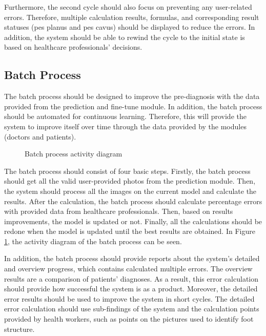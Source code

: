 Furthermore, the second cycle should also focus on preventing any user-related errors. Therefore, multiple calculation results, formulas, and corresponding result statuses (pes planus and pes cavus) should be displayed to reduce the errors. In addition, the system should be able to rewind the cycle to the initial state is based on healthcare professionals' decisions.

\subsection{ Batch Process }

The batch process should be designed to improve the pre-diagnosis with the data provided from the prediction and fine-tune module. In addition, the batch process should be automated for continuous learning. Therefore, this will provide the system to improve itself over time through the data provided by the modules (doctors and patients). 

\begin{figure}[htbp]
\centering
{}
\caption{Batch process activity diagram}
\label{fig:BatchProcessActivityDiagram}
\end{figure}

The batch process should consist of four basic steps. Firstly, the batch process should get all the valid user-provided photos from the prediction module. Then, the system should process all the images on the current model and calculate the results. After the calculation, the batch process should calculate percentage errors with provided data from healthcare professionals. Then, based on results improvements, the model is updated or not. Finally, all the calculations should be redone when the model is updated until the best results are obtained. In Figure \ref{fig:BatchProcessActivityDiagram}, the activity diagram of the batch process can be seen.

In addition, the batch process should provide reports about the system's detailed and overview progress, which contains calculated multiple errors. The overview results are a comparison of patients' diagnoses. As a result, this error calculation should provide how successful the system is as a product. Moreover, the detailed error results should be used to improve the system in short cycles. The detailed error calculation should use sub-findings of the system and the calculation points provided by health workers, such as points on the pictures used to identify foot structure. 

